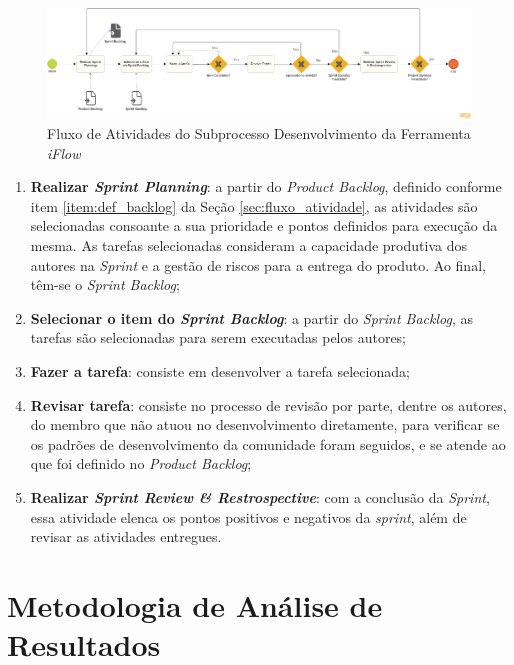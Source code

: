\begin{figure}[H]
    \begin{center}
        \caption{Fluxo de Atividades do Subprocesso Desenvolvimento da Ferramenta \textit{iFlow}}
        \label{fig:bpmn_dev}
        \includegraphics[scale=0.23]{figuras/Metodologia/bpmn_dev.png}
    \end{center}
\end{figure}

\begin{enumerate}
    \item \textbf{Realizar \textit{Sprint Planning}}: a partir do \textit{Product Backlog}, definido conforme item \ref{item:def_backlog} da Seção \ref{sec:fluxo_atividade}, as atividades são selecionadas consoante a sua prioridade e pontos definidos para execução da mesma. As tarefas selecionadas consideram a capacidade produtiva dos autores na \textit{Sprint} e a gestão de riscos para a entrega do produto. Ao final, têm-se o \textit{Sprint Backlog};
    \item \textbf{Selecionar o item do \textit{Sprint Backlog}}: a partir do \textit{Sprint Backlog}, as tarefas são selecionadas para serem executadas pelos autores;
    \item \textbf{Fazer a tarefa}: consiste em desenvolver a tarefa selecionada;
    \item \textbf{Revisar tarefa}: consiste no processo de revisão por parte, dentre os autores, do membro que não atuou no desenvolvimento diretamente, para verificar se os padrões de desenvolvimento da comunidade foram seguidos, e se atende ao que foi definido no \textit{Product Backlog};
    \item \textbf{Realizar \textit{Sprint Review \& Restrospective}}: com a conclusão da \textit{Sprint}, essa atividade elenca os pontos positivos e negativos da \textit{sprint}, além de revisar as atividades entregues.
\end{enumerate}


\section{Metodologia de Análise de Resultados}

